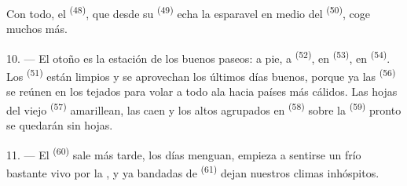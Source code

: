 Con todo, el  \textsuperscript{(48)}, que desde su
 \textsuperscript{(49)} echa la esparavel en medio del 
\textsuperscript{(50)}, coge muchos más.

10. --- El otoño es la estación de los buenos paseos: a pie, a
 \textsuperscript{(52)}, en  \textsuperscript{(53)}, en
 \textsuperscript{(54)}. Los  \textsuperscript{(51)} están
limpios y se aprovechan los últimos días buenos, porque ya las
 \textsuperscript{(56)} se reúnen en los tejados para volar a
todo ala hacia países más cálidos. Las hojas del viejo 
\textsuperscript{(57)} amarillean, las  caen y los altos
 agrupados en  \textsuperscript{(58)} sobre la
 \textsuperscript{(59)} pronto se quedarán sin hojas.

11. --- El  \textsuperscript{(60)} sale más tarde, los días menguan,
empieza a sentirse un frío bastante vivo por la , y ya
bandadas de  \textsuperscript{(61)} dejan nuestros climas
inhóspitos.
\VUsaut{6.0mm}
\VUfilet{22mm}
